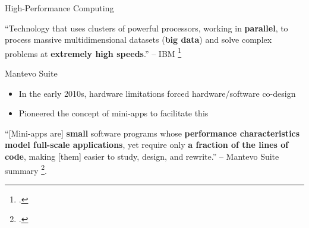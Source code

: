 \documentclass[10pt,aspectratio=169]{beamer}
\begin{document}
\begin{frame}{High-Performance Computing}
    \begin{displayquote}
        \vspace{0.2cm}
        ``Technology that uses clusters of powerful processors, working in \textbf{parallel}, to process massive multidimensional datasets (\textbf{big data}) and solve complex problems at \textbf{extremely high speeds}.'' -- IBM \footcite{WhatHPCIntroduction}
    \end{displayquote}
\end{frame}

\begin{frame}{Mantevo Suite}
    \begin{itemize}
        \item In the early 2010s, hardware limitations forced hardware/software co-design
        \item Pioneered the concept of mini-apps to facilitate this
    \end{itemize}
    \vspace*{0.75cm}
    \begin{displayquote}
        \vspace{0.2cm}
        ``[Mini-apps are] \textbf{small} software programs whose \textbf{performance characteristics model full-scale applications}, yet require only \textbf{a fraction of the lines of code}, making [them] easier to study, design, and rewrite.'' -- Mantevo Suite summary \footcite{heroux2013mantevo}.
    \end{displayquote}
\end{frame}
\end{document}
